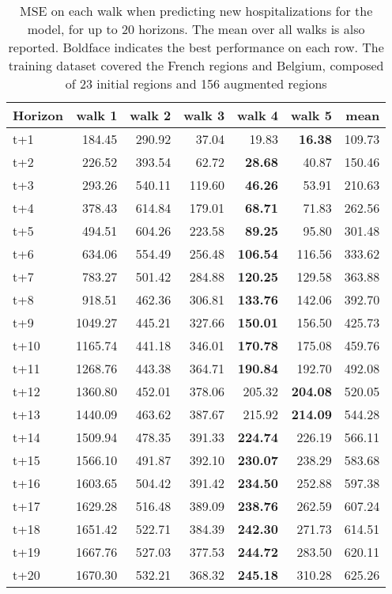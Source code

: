 \begin{table}[H]
\centering
\caption{MSE on each walk when predicting new hospitalizations for the model, for up to 20 horizons. The mean over all walks is also reported. Boldface indicates the best performance on each row. The training dataset covered the French regions and Belgium, composed of 23 initial regions and 156 augmented regions }
\label{tab:MSE_walk_encoder_decoder}
\begin{tabular}{lrrrrrr}
\toprule
Horizon &  walk 1 &  walk 2 &  walk 3 &  walk 4 &  walk 5 &   mean \\
\midrule
t+1  & 184.45  & 290.92  & 37.04  & 19.83  & \textbf{16.38}  & 109.73  \\
t+2  & 226.52  & 393.54  & 62.72  & \textbf{28.68}  & 40.87  & 150.46  \\
t+3  & 293.26  & 540.11  & 119.60  & \textbf{46.26}  & 53.91  & 210.63  \\
t+4  & 378.43  & 614.84  & 179.01  & \textbf{68.71}  & 71.83  & 262.56  \\
t+5  & 494.51  & 604.26  & 223.58  & \textbf{89.25}  & 95.80  & 301.48  \\
t+6  & 634.06  & 554.49  & 256.48  & \textbf{106.54}  & 116.56  & 333.62  \\
t+7  & 783.27  & 501.42  & 284.88  & \textbf{120.25}  & 129.58  & 363.88  \\
t+8  & 918.51  & 462.36  & 306.81  & \textbf{133.76}  & 142.06  & 392.70  \\
t+9  & 1049.27  & 445.21  & 327.66  & \textbf{150.01}  & 156.50  & 425.73  \\
t+10  & 1165.74  & 441.18  & 346.01  & \textbf{170.78}  & 175.08  & 459.76  \\
t+11  & 1268.76  & 443.38  & 364.71  & \textbf{190.84}  & 192.70  & 492.08  \\
t+12  & 1360.80  & 452.01  & 378.06  & 205.32  & \textbf{204.08}  & 520.05  \\
t+13  & 1440.09  & 463.62  & 387.67  & 215.92  & \textbf{214.09}  & 544.28  \\
t+14  & 1509.94  & 478.35  & 391.33  & \textbf{224.74}  & 226.19  & 566.11  \\
t+15  & 1566.10  & 491.87  & 392.10  & \textbf{230.07}  & 238.29  & 583.68  \\
t+16  & 1603.65  & 504.42  & 391.42  & \textbf{234.50}  & 252.88  & 597.38  \\
t+17  & 1629.28  & 516.48  & 389.09  & \textbf{238.76}  & 262.59  & 607.24  \\
t+18  & 1651.42  & 522.71  & 384.39  & \textbf{242.30}  & 271.73  & 614.51  \\
t+19  & 1667.76  & 527.03  & 377.53  & \textbf{244.72}  & 283.50  & 620.11  \\
t+20  & 1670.30  & 532.21  & 368.32  & \textbf{245.18}  & 310.28  & 625.26  \\

\bottomrule
\end{tabular}
\end{table}
